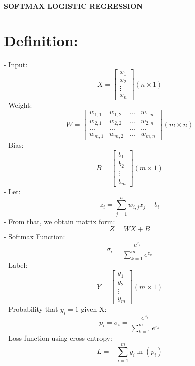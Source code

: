 \documentclass{article}
\begin{document}
    \begin{center}
        {\Large \textbf{SOFTMAX LOGISTIC REGRESSION}}
    \end{center}
    \section*{Definition:}
    - Input:
    \[
        X = 
        \begin{bmatrix}
            x_1 \\
            x_2 \\
            \vdots \\
            x_n
        \end{bmatrix} (n \times 1)
    \]
    - Weight: 
    \[
        W = 
        \begin{bmatrix}
            w_{1, 1} & w_{1, 2} & \hdots & w_{1, n} \\
            w_{2, 1} & w_{2, 2} & \hdots & w_{2, n} \\
            \hdots & \hdots & \hdots & \hdots \\
            w_{m, 1} & w_{m, 2} & \hdots & w_{m, n}
        \end{bmatrix} (m \times n)
    \]
    - Bias: 
    \[
        B = 
        \begin{bmatrix}
            b_1 \\
            b_2 \\
            \vdots \\
            b_m
        \end{bmatrix} (m \times 1)
    \]
    - Let:
    \[
        z_i = \sum_{j = 1}^{n}w_{i, j}x_j + b_i
    \]
    - From that, we obtain matrix form:
    \[
        Z = WX + B
    \]
    - Softmax Function:
    \[
        \sigma_i = \frac{e^{z_i}}{\sum_{k = 1}^{m}e^{z_k}}
    \]
    - Label:
    \[
        Y = 
        \begin{bmatrix}
            y_1 \\
            y_2 \\
            \vdots \\
            y_m
        \end{bmatrix} (m \times 1)
    \]
    - Probability that $y_i = 1$ given X:
    \[
        p_i = \sigma_i = \frac{e^{z_i}}{\sum_{k = 1}^{m}e^{z_k}}
    \]
    - Loss function using cross-entropy:
    \[
        L = -\sum_{i = 1}^{m}y_i\ln\left(p_i\right)
    \]
\end{document}
